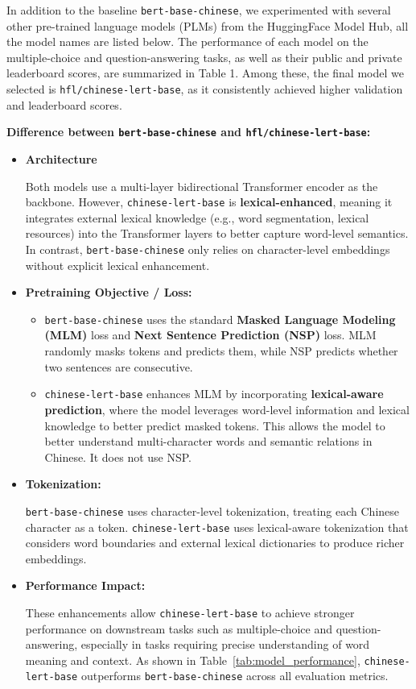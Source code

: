 \documentclass{article}
\begin{document}
In addition to the baseline \texttt{bert-base-chinese}, we experimented with several other pre-trained language models (PLMs) from the HuggingFace Model Hub, all the model names are listed below. The performance of each model on the multiple-choice and question-answering tasks, as well as their public and private leaderboard scores, are summarized in Table 1. Among these, the final model we selected is \texttt{hfl/chinese-lert-base}, as it consistently achieved higher validation and leaderboard scores.

\textbf{Difference between \texttt{bert-base-chinese} and \texttt{hfl/chinese-lert-base}:}

\begin{itemize}
    \item \textbf{Architecture}

          Both models use a multi-layer bidirectional Transformer encoder as the backbone. However, \texttt{chinese-lert-base} is \textbf{lexical-enhanced}, meaning it integrates external lexical knowledge (e.g., word segmentation, lexical resources) into the Transformer layers to better capture word-level semantics. In contrast, \texttt{bert-base-chinese} only relies on character-level embeddings without explicit lexical enhancement.

    \item \textbf{Pretraining Objective / Loss:}

          \begin{itemize}
              \item \texttt{bert-base-chinese} uses the standard \textbf{Masked Language Modeling (MLM)} loss and \textbf{Next Sentence Prediction (NSP)} loss. MLM randomly masks tokens and predicts them, while NSP predicts whether two sentences are consecutive.
              \item \texttt{chinese-lert-base} enhances MLM by incorporating \textbf{lexical-aware prediction}, where the model leverages word-level information and lexical knowledge to better predict masked tokens. This allows the model to better understand multi-character words and semantic relations in Chinese. It does not use NSP.
          \end{itemize}

    \item \textbf{Tokenization:}

          \texttt{bert-base-chinese} uses character-level tokenization, treating each Chinese character as a token.
          \texttt{chinese-lert-base} uses lexical-aware tokenization that considers word boundaries and external lexical dictionaries to produce richer embeddings.

    \item \textbf{Performance Impact:}

          These enhancements allow \texttt{chinese-lert-base} to achieve stronger performance on downstream tasks such as multiple-choice and question-answering, especially in tasks requiring precise understanding of word meaning and context.
          As shown in Table~\ref{tab:model_performance}, \texttt{chinese-lert-base} outperforms \texttt{bert-base-chinese} across all evaluation metrics.
\end{itemize}
\end{document}
